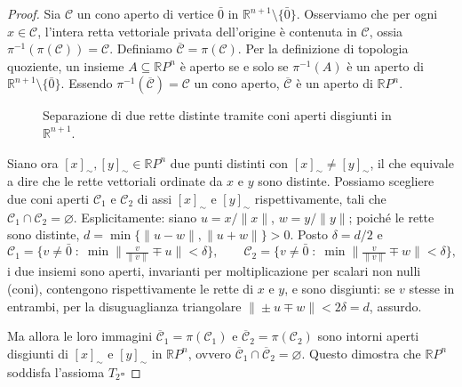 \begin{proof}
Sia $\mathcal{C}$ un cono aperto di vertice $\bar{0}$ in $\mathbb{R}^{n+1} \setminus \{\bar{0}\}$.
Osserviamo che per ogni $x \in \mathcal{C}$, l'intera retta vettoriale privata dell'origine è contenuta in $\mathcal{C}$, ossia $\pi^{-1}(\pi(\mathcal{C})) = \mathcal{C}$.
Definiamo $\overline{\mathcal{C}} = \pi(\mathcal{C})$. Per la definizione di topologia quoziente, un insieme $A \subseteq \mathbb{R}P^n$ è aperto se e solo se $\pi^{-1}(A)$ è un aperto di $\mathbb{R}^{n+1} \setminus \{\bar{0}\}$.
Essendo $\pi^{-1}(\overline{\mathcal{C}}) = \mathcal{C}$ un cono aperto, $\overline{\mathcal{C}}$ è un aperto di $\mathbb{R}P^n$.

\begin{figure}[H]
    \centering
    \caption{Separazione di due rette distinte tramite coni aperti disgiunti in $\mathbb{R}^{n+1}$.}
\end{figure}

Siano ora $[x]_\sim, [y]_\sim \in \mathbb{R}P^n$ due punti distinti con $[x]_\sim \neq [y]_\sim$, il che equivale a dire che le rette vettoriali ordinate da $x$ e $y$ sono distinte.
Possiamo scegliere due coni aperti $\mathcal{C}_1$ e $\mathcal{C}_2$ di assi $[x]_\sim$ e $[y]_\sim$ rispettivamente, tali che $\mathcal{C}_1 \cap \mathcal{C}_2 = \varnothing$. Esplicitamente: siano $u = x/\|x\|$, $w = y/\|y\|$; poich\'e le rette sono distinte, $d = \min\{\|u - w\|, \|u + w\|\} > 0$. Posto $\delta = d/2$ e
\[
\mathcal{C}_1 = \Big\{ v \neq \bar 0 \;:\; \min\big\|\tfrac{v}{\|v\|} \mp u\big\| < \delta \Big\}, \qquad
\mathcal{C}_2 = \Big\{ v \neq \bar 0 \;:\; \min\big\|\tfrac{v}{\|v\|} \mp w\big\| < \delta \Big\},
\]
i due insiemi sono aperti, invarianti per moltiplicazione per scalari non nulli (coni), contengono rispettivamente le rette di $x$ e $y$, e sono disgiunti: se $v$ stesse in entrambi, per la disuguaglianza triangolare $\|\pm u \mp w\| < 2\delta = d$, assurdo.

Ma allora le loro immagini $\overline{\mathcal{C}}_1 = \pi(\mathcal{C}_1)$ e $\overline{\mathcal{C}}_2 = \pi(\mathcal{C}_2)$ sono intorni aperti disgiunti di $[x]_\sim$ e $[y]_\sim$ in $\mathbb{R}P^n$, ovvero $\overline{\mathcal{C}}_1 \cap \overline{\mathcal{C}}_2 = \varnothing$.
Questo dimostra che $\mathbb{R}P^n$ soddisfa l'assioma $T_2$\hfill$\square$
\end{proof}

